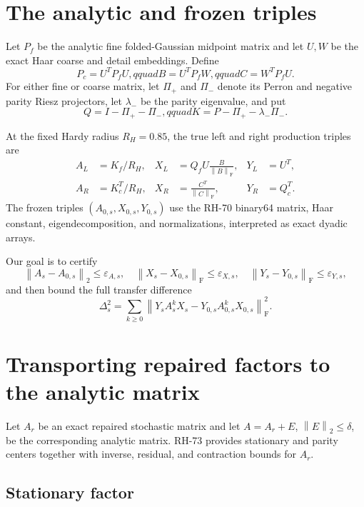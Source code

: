 \documentclass[11pt]{article}
\theoremstyle{definition}
\newcommand{\norm}[1]{\left\lVert#1\right\rVert}
\newcommand{\F}{\mathrm F}
\begin{document}
\section{The analytic and frozen triples}
\label{sec:triples}

Let $P_f$ be the analytic fine folded-Gaussian midpoint matrix and let $U,W$
be the exact Haar coarse and detail embeddings.  Define
\[
 P_c=U^TP_fU,qquad B=U^TP_fW,qquad C=W^TP_fU.
\]
For either fine or coarse matrix, let $\Pi_+$ and $\Pi_-$ denote its Perron and
negative parity Riesz projectors, let $\lambda_-$ be the parity eigenvalue, and
put
\[
 Q=I-\Pi_+-\Pi_-,qquad
 K=P-\Pi_+-\lambda_-\Pi_-.
\]

At the fixed Hardy radius $R_H=0.85$, the true left and right production
triples are
\begin{align}
 A_L&=K_f/R_H,&
 X_L&=Q_fU\frac{B}{\norm B_{\F}},&
 Y_L&=U^T,\label{eq:left}\\
 A_R&=K_c^T/R_H,&
 X_R&=\frac{C^T}{\norm C_{\F}},&
 Y_R&=Q_c^T.\label{eq:right}
\end{align}
The frozen triples $(A_{0,s},X_{0,s},Y_{0,s})$ use the RH-70 binary64 matrix,
Haar constant, eigendecomposition, and normalizations, interpreted as exact
dyadic arrays.

Our goal is to certify
\[
 \norm{A_s-A_{0,s}}_2\le\varepsilon_{A,s},
 \quad
 \norm{X_s-X_{0,s}}_{\F}\le\varepsilon_{X,s},
 \quad
 \norm{Y_s-Y_{0,s}}_{\F}\le\varepsilon_{Y,s},
 \label{eq:triple-errors}
\]
and then bound the full transfer difference
\begin{equation}
 \Delta_s^2
 =\sum_{k\ge0}
 \norm{Y_sA_s^kX_s-Y_{0,s}A_{0,s}^kX_{0,s}}_{\F}^2.
 \label{eq:bridge}
\end{equation}

\section{Transporting repaired factors to the analytic matrix}
\label{sec:factors}

Let $A_r$ be an exact repaired stochastic matrix and let
$A=A_r+E$, $\norm E_2\le\delta$, be the corresponding analytic matrix.
RH-73 provides stationary and parity centers together with inverse,
residual, and contraction bounds for $A_r$.

\subsection{Stationary factor}
\end{document}
